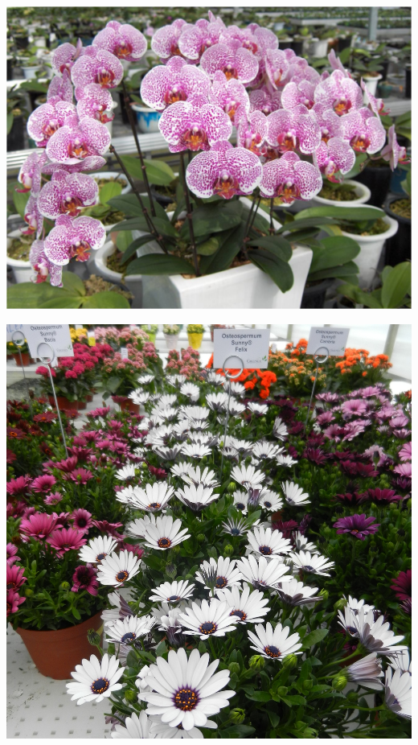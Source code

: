 \documentclass{article}
\begin{document}
\begin{center}
\includegraphics[height=0.925\paperheight]{../Orchid_Phalaenopsis_(MothOrchid)_Plant.jpg}
\end{center}
\newpage

\begin{center}
\includegraphics[height=0.925\paperheight]{../Osteospermum.jpg}
\end{center}
\newpage
\end{document}
